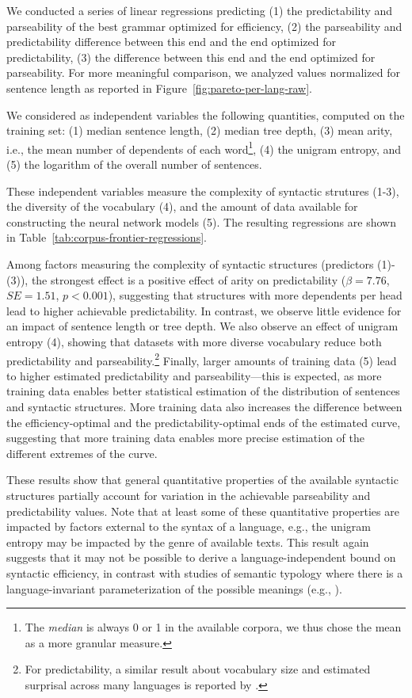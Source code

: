 \documentclass[10pt,twoside,lineno]{article}
\begin{document}
We conducted a series of linear regressions predicting (1) the predictability and parseability of the best grammar optimized for efficiency, (2) the parseability and predictability difference between this end and the end optimized for predictability, (3) the difference between this end and the end optimized for parseability.
For more meaningful comparison, we analyzed values normalized for sentence length as reported in Figure~\ref{fig:pareto-per-lang-raw}.

We considered as independent variables the following quantities, computed on the training set: (1) median sentence length, (2) median tree depth, (3) mean arity, i.e., the mean number of dependents of each word\footnote{The \emph{median} is always 0 or 1 in the available corpora, we thus chose the mean as a more granular measure.}, (4) the unigram entropy, and (5) the logarithm of the overall number of sentences.

These independent variables measure the complexity of syntactic strutures (1-3), the diversity of the vocabulary (4), and the amount of data available for constructing the neural network models (5).
The resulting regressions are shown in Table~\ref{tab:corpus-frontier-regressions}.

Among factors measuring the complexity of syntactic structures (predictors (1)-(3)), the strongest effect is a positive effect of arity on predictability ($\beta=7.76$, $SE=1.51$, $p < 0.001$), suggesting that structures with more dependents per head lead to higher achievable predictability.
In contrast, we observe little evidence for an impact of sentence length or tree depth.
We also observe an effect of unigram entropy (4), showing that datasets with more diverse vocabulary reduce both predictability and parseability.\footnote{For predictability, a similar result about vocabulary size and estimated surprisal across many languages is reported by \cite{mielke-et-al-2019}.}
Finally, larger amounts of training data (5) lead to higher estimated predictability and parseability---this is expected, as more training data enables better statistical estimation of the distribution of sentences and syntactic structures.
More training data also increases the difference between the efficiency-optimal and the predictability-optimal ends of the estimated curve, suggesting that more training data enables more precise estimation of the different extremes of the curve.


These results show that general quantitative properties of the available syntactic structures partially account for variation in the achievable parseability and predictability values.
Note that at least some of these quantitative properties are impacted by factors external to the syntax of a language, e.g., the unigram entropy may be impacted by the genre of available texts.
This result again suggests that it may not be possible to derive a language-independent bound on syntactic efficiency, in contrast with studies of semantic typology where there is a language-invariant parameterization of the possible meanings (e.g., \cite{kemp2012kinship,xu2014numeral,zaslavsky2018efficient}).
\end{document}
